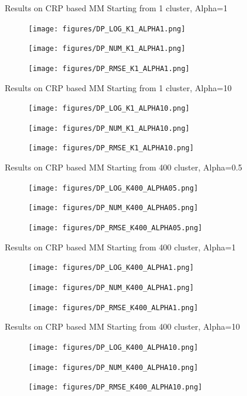 \documentclass[handout]{beamer}
\begin{document}
\begin{frame}{Results on CRP based MM}
Starting from 1 cluster, Alpha=1

\begin{figure}[H]
\texttt{[image: figures/DP\_LOG\_K1\_ALPHA1.png]}

\texttt{[image: figures/DP\_NUM\_K1\_ALPHA1.png]}

\texttt{[image: figures/DP\_RMSE\_K1\_ALPHA1.png]}
\end{figure}
\end{frame}

\begin{frame}{Results on CRP based MM}
Starting from 1 cluster, Alpha=10

\begin{figure}[H]
\texttt{[image: figures/DP\_LOG\_K1\_ALPHA10.png]}

\texttt{[image: figures/DP\_NUM\_K1\_ALPHA10.png]}

\texttt{[image: figures/DP\_RMSE\_K1\_ALPHA10.png]}
\end{figure}
\end{frame}

\begin{frame}{Results on CRP based MM}
Starting from 400 cluster, Alpha=0.5

\begin{figure}[H]
\texttt{[image: figures/DP\_LOG\_K400\_ALPHA05.png]}

\texttt{[image: figures/DP\_NUM\_K400\_ALPHA05.png]}

\texttt{[image: figures/DP\_RMSE\_K400\_ALPHA05.png]}
\end{figure}
\end{frame}

\begin{frame}{Results on CRP based MM}
Starting from 400 cluster, Alpha=1

\begin{figure}[H]
\texttt{[image: figures/DP\_LOG\_K400\_ALPHA1.png]}

\texttt{[image: figures/DP\_NUM\_K400\_ALPHA1.png]}

\texttt{[image: figures/DP\_RMSE\_K400\_ALPHA1.png]}
\end{figure}
\end{frame}

\begin{frame}{Results on CRP based MM}
Starting from 400 cluster, Alpha=10

\begin{figure}[H]
\texttt{[image: figures/DP\_LOG\_K400\_ALPHA10.png]}

\texttt{[image: figures/DP\_NUM\_K400\_ALPHA10.png]}

\texttt{[image: figures/DP\_RMSE\_K400\_ALPHA10.png]}
\end{figure}
\end{frame}
\end{document}
